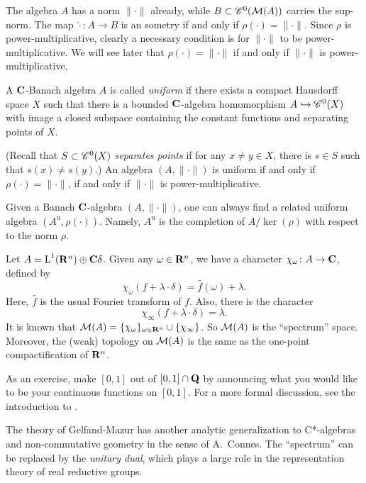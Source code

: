 The algebra $A$ has a norm $\|\cdot\|$ already, while 
$B\subset \mathscr{C}^0(\mathcal{M}(A))$ carries the sup-norm. The map $\hat\cdot\colon A\to B$ 
is an sometry if and only if $\rho(\cdot)=\|\cdot\|$. Since $\rho$ is 
power-multiplicative, clearly a necessary condition is for $\|\cdot\|$ to be 
power-multiplicative. We will see later that $\rho(\cdot)=\|\cdot\|$ if and 
only if $\|\cdot\|$ is power-multiplicative. 

\begin{definition}[Old]
A $\mathbf{C}$-Banach algebra $A$ is called \emph{uniform} if there exists a compact 
Hausdorff space $X$ such that there is a bounded $\mathbf{C}$-algebra homomorphism
$A\hookrightarrow \mathscr{C}^0(X)$ with image a closed subspace containing the 
constant functions and separating points of $X$. 
\end{definition}

(Recall that $S\subset \mathscr{C}^0(X)$ \emph{separates points} if for any 
$x\ne y\in X$, there is $s\in S$ such that $s(x)\ne s(y)$.) An algebra 
$(A,\|\cdot\|)$ is uniform if and only if $\rho(\cdot)=\|\cdot\|$, if and only 
if $\|\cdot\|$ is power-multiplicative. 

Given a Banach $\mathbf{C}$-algebra $(A,\|\cdot\|)$, one can always find a related 
uniform algebra $(A^\mathrm{u},\rho(\cdot))$. Namely, $A^\mathrm{u}$ is the 
completion of $A/\ker(\rho)$ with respect to the norm $\rho$. 

\begin{example}
Let $A=\operatorname{L}^1(\mathbf{R}^n)\oplus \mathbf{C}\delta$. Given any $\omega\in \mathbf{R}^n$, we have a 
character $\chi_\omega\colon A\to \mathbf{C}$, defined by 
\[
  \chi_\omega(f+\lambda\cdot\delta) = \hat f(\omega) + \lambda .
\]
Here, $\hat f$ is the usual Fourier transform of $f$. Also, there is the 
character 
\[
  \chi_\infty(f+\lambda\cdot \delta) = \lambda .
\]
It is known that 
$\mathcal{M}(A) = \{\chi_\omega\}_{\omega\in \mathbf{R}^n}\cup\{\chi_\infty\}$. So 
$\mathcal{M}(A)$ is the ``spectrum'' space. Moreover, the (weak) topology on $\mathcal{M}(A)$ 
is the same as the one-point compactification of $\mathbf{R}^n$. 
\end{example}

As an exercise, make $[0,1]$ out of $[0,1]\cap \mathbf{Q}$ by announcing what you 
would like to be your continuous functions on $[0,1]$. For a more formal 
discussion, see the introduction to \cite{berkovich-1990}. 

The theory of Gelfand-Mazur has another analytic generalization to 
C*-algebras and non-commutative geometry in the sense of A.~Connes. The 
``spectrum'' can be replaced by the \emph{unitary dual}, which plays a large 
role in the representation theory of real reductive groups. 





